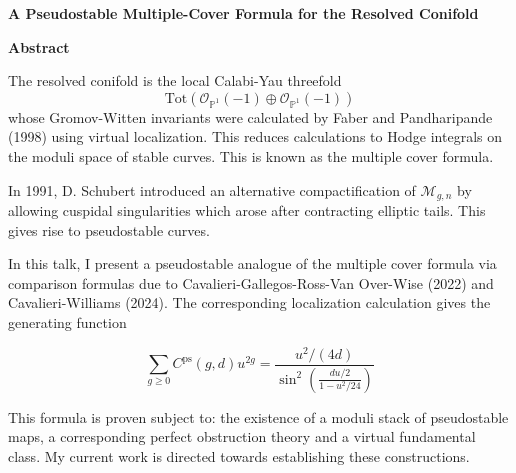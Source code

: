 \documentclass[12pt]{memoir}
\begin{document}
\textbf{A Pseudostable Multiple-Cover Formula for the Resolved Conifold}\par

\textbf{Abstract}\par

The resolved conifold is the local Calabi-Yau threefold
\[
\text{Tot}\left(\mathcal{O}_{\mathbb{P}^1}(-1)\oplus\mathcal{O}_{\mathbb{P}^1}(-1)\right)
\]
whose Gromov-Witten invariants were calculated by Faber and Pandharipande (1998) using virtual localization. This reduces calculations to Hodge integrals on the moduli space of stable curves. This is known as the multiple cover formula.

In 1991, D. Schubert introduced an alternative compactification of \(\mathcal{M}_{g,n}\) by allowing cuspidal singularities which arose after contracting elliptic tails. This gives rise to pseudostable curves.

In this talk, I present a pseudostable analogue of the multiple cover formula via comparison formulas due to Cavalieri-Gallegos-Ross-Van Over-Wise (2022) and Cavalieri-Williams (2024). The corresponding localization calculation gives the generating function

\[
\sum_{g\geq0}C^{\mathrm{ps}}(g,d)u^{2g}=
\frac{u^2/(4d)}{\sin^2\left(\frac{du/2}{1-u^2/24}\right)}
\]

This formula is proven subject to: the existence of a moduli stack of pseudostable maps, a corresponding perfect obstruction theory and a virtual fundamental class. My current work is directed towards establishing these constructions.
\ifx\nextra\undefined
    \printindex
\else\fi
\nocite{*}


\end{document}
